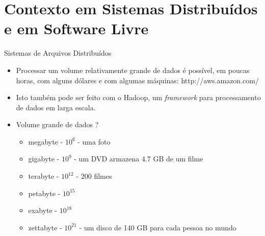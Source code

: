  \section{Contexto em Sistemas Distribuídos e em Software Livre}

  \begin{frame}{Sistemas de Arquivos Distribuídos}
     \begin{itemize}
      \item<1-> Processar um volume relativamente grande de dados é possível, em poucas horas, com alguns dólares e com algumas máquinas: http://aws.amazon.com/
      \item<2-> Isto também pode ser feito com o Hadoop, um \emph{framework} para processamento de dados em larga escala.
      \item<3-> Volume grande de dados ?
          \begin{itemize}
             \item<4-> megabyte - $10^6$ - uma foto
             \item<5-> gigabyte - $10^9$ - um DVD armazena 4.7 GB de um filme
             \item<6-> terabyte - $10^{12}$ - 200 filmes
             \item<7-> petabyte - $10^{15}$
             \item<8-> exabyte - $10^{18}$
             \item<9-> zettabyte - $10^{21}$ - um disco de 140 GB para cada pessoa no mundo
          \end{itemize}
     \end{itemize}
  \end{frame}

